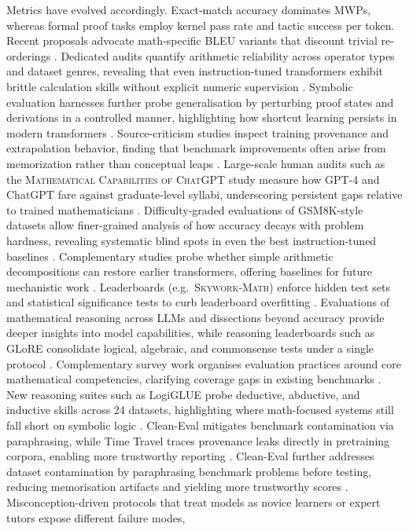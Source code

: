 \documentclass[acmsmall,anonymous]{acmart}
\begin{document}
Metrics have evolved accordingly.  Exact‐match accuracy dominates MWPs, whereas formal proof tasks employ kernel pass rate and tactic success per token.  Recent proposals advocate math‐specific BLEU variants that discount trivial re-orderings \cite{li2024benchmarkingllmmath}. Dedicated audits quantify arithmetic reliability across operator types and dataset genres, revealing that even instruction-tuned transformers exhibit brittle calculation skills without explicit numeric supervision \cite{yuan-2023-arithmetic-eval}.  Symbolic evaluation harnesses further probe generalisation by perturbing proof states and derivations in a controlled manner, highlighting how shortcut learning persists in modern transformers \cite{meadows-2024-symbolic-framework}.  Source-criticism studies inspect training provenance and extrapolation behavior, finding that benchmark improvements often arise from memorization rather than conceptual leaps \cite{yousefzadeh-2023-source-criticism}.  Large-scale human audits such as the \textsc{Mathematical Capabilities of ChatGPT} study measure how GPT-4 and ChatGPT fare against graduate-level syllabi, underscoring persistent gaps relative to trained mathematicians \cite{frieder-2023-math-capabilities}.  Difficulty-graded evaluations of GSM8K-style datasets allow finer-grained analysis of how accuracy decays with problem hardness, revealing systematic blind spots in even the best instruction-tuned baselines \cite{liu-2023-large-scale-mwp-eval}.  Complementary studies probe whether simple arithmetic decompositions can restore earlier transformers, offering baselines for future mechanistic work \cite{muffo2023evaluatingtransformerlanguagemodels}.  Leaderboards (e.g.\ \textsc{Skywork‐Math}) enforce hidden test sets and statistical significance tests to curb leaderboard overfitting \cite{zeng2024skywork}. Evaluations of mathematical reasoning across LLMs \cite{anonymous2025evaluatingmathreasoning,anonymous2025evaluationmathsolving,anonymous2025evaluationmathsolving,anonymous2025evaluatingmathreasoning} and dissections beyond accuracy \cite{anonymous2025beyondaccuracy,anonymous2025beyondaccuracy} provide deeper insights into model capabilities, while reasoning leaderboards such as GLoRE consolidate logical, algebraic, and commonsense tests under a single protocol \cite{liu-2025-glore}.  Complementary survey work organises evaluation practices around core mathematical competencies, clarifying coverage gaps in existing benchmarks \cite{zhuang-2023-core-competency-survey}.  New reasoning suites such as LogiGLUE probe deductive, abductive, and inductive skills across 24 datasets, highlighting where math-focused systems still fall short on symbolic logic \cite{luo-2024-logiglue}.  Clean-Eval mitigates benchmark contamination via paraphrasing, while Time Travel traces provenance leaks directly in pretraining corpora, enabling more trustworthy reporting \cite{zhu2024cleanevalcleanevaluationcontaminated,golchin-2024-time-travel}.  Clean-Eval further addresses dataset contamination by paraphrasing benchmark problems before testing, reducing memorisation artifacts and yielding more trustworthy scores \cite{zhu2024cleanevalcleanevaluationcontaminated}. Misconception-driven protocols that treat models as novice learners or expert tutors expose different failure modes, 
\end{document}
